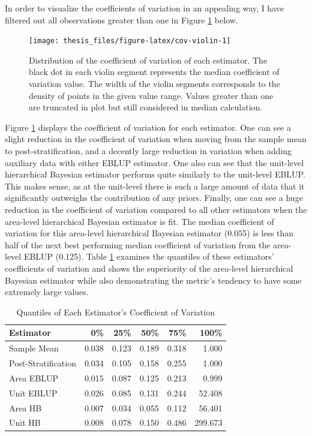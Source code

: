 \documentclass[12pt,twoside]{reedthesis}
\begin{document}
In order to visualize the coefficients of variation in an appealing way, I have filtered out all observations greater than one in Figure \ref{fig:cov-violin} below.
\begin{figure}

{\centering \texttt{[image: thesis\_files/figure-latex/cov-violin-1]} 

}

\caption[Distribution of the coefficient of variation of each estimator]{Distribution of the coefficient of variation of each estimator. The black dot in each violin segment represents the median coefficient of variation value. The width of the violin segments corresponds to the density of points in the given value range. Values greater than one are truncated in plot but still considered in median calculation.}\label{fig:cov-violin}
\end{figure}
Figure \ref{fig:cov-violin} displays the coefficient of variation for each estimator. One can see a slight reduction in the coefficient of variation when moving from the sample mean to post-stratification, and a decently large reduction in variation when adding auxiliary data with either EBLUP estimator. One also can see that the unit-level hierarchical Bayesian estimator performs quite similarly to the unit-level EBLUP. This makes sense, as at the unit-level there is such a large amount of data that it significantly outweighs the contribution of any priors. Finally, one can see a huge reduction in the coefficient of variation compared to all other estimators when the area-level hierarchical Bayesian estimator is fit. The median coefficient of variation for this area-level hierarchical Bayesian estimator (0.055) is less than half of the next best performing median coefficient of variation from the area-level EBLUP (0.125). Table \ref{tab:quantile-table} examines the quantiles of these estimators' coefficients of variation and shows the superiority of the area-level hierarchical Bayesian estimator while also demonstrating the metric's tendency to have some extremely large values.
\begin{longtable}[t]{lrrrrr}
\caption[Coefficient of Variation Quantiles]{\label{tab:quantile-table}Quantiles of Each Estimator's Coefficient of Variation}\\
\toprule
Estimator & 0\% & 25\% & 50\% & 75\% & 100\%\\
\midrule
Sample Mean & 0.038 & 0.123 & 0.189 & 0.318 & 1.000\\
Post-Stratification & 0.034 & 0.105 & 0.158 & 0.255 & 1.000\\
Area EBLUP & 0.015 & 0.087 & 0.125 & 0.213 & 0.999\\
Unit EBLUP & 0.026 & 0.085 & 0.131 & 0.244 & 52.408\\
Area HB & 0.007 & 0.034 & 0.055 & 0.112 & 56.401\\
\addlinespace
Unit HB & 0.008 & 0.078 & 0.150 & 0.486 & 299.673\\
\bottomrule
\end{longtable}
\end{document}
